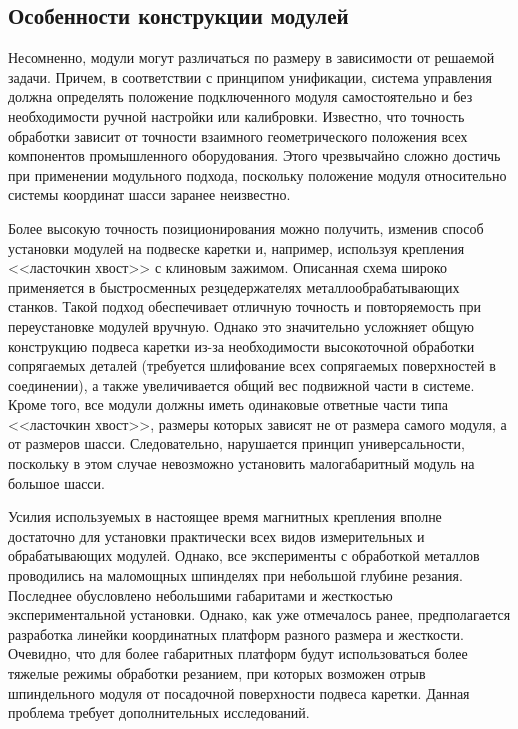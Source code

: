 \subsection{Особенности конструкции модулей}

Несомненно, модули могут различаться по размеру в зависимости от решаемой задачи. Причем, в соответствии с принципом унификации, система управления должна определять положение подключенного модуля самостоятельно и без необходимости ручной настройки или калибровки. Известно, что точность обработки зависит от точности взаимного геометрического положения всех компонентов промышленного оборудования. Этого чрезвычайно сложно достичь при применении модульного подхода, поскольку положение модуля относительно системы координат шасси заранее неизвестно.

Более высокую точность позиционирования можно получить, изменив способ установки модулей на подвеске каретки и, например, используя крепления <<ласточкин хвост>> с клиновым зажимом. Описанная схема широко применяется в быстросменных резцедержателях металлообрабатывающих станков. Такой подход обеспечивает отличную точность и повторяемость при переустановке модулей вручную. Однако это значительно усложняет общую конструкцию подвеса каретки из-за необходимости высокоточной обработки сопрягаемых деталей (требуется шлифование всех сопрягаемых поверхностей в соединении), а также увеличивается общий вес подвижной части в системе. Кроме того, все модули должны иметь одинаковые ответные части типа <<ласточкин хвост>>, размеры которых зависят не от размера самого модуля, а от размеров шасси. Следовательно, нарушается принцип универсальности, поскольку в этом случае невозможно установить малогабаритный модуль на большое шасси.

Усилия используемых в настоящее время магнитных крепления вполне достаточно для установки практически всех видов измерительных и обрабатывающих модулей. Однако, все эксперименты с обработкой металлов проводились на маломощных шпинделях при небольшой глубине резания. Последнее обусловлено небольшими габаритами и жесткостью экспериментальной установки. Однако, как уже отмечалось ранее, предполагается разработка линейки координатных платформ разного размера и жесткости. Очевидно, что для более габаритных платформ будут использоваться более тяжелые режимы обработки резанием, при которых возможен отрыв шпиндельного модуля от посадочной поверхности подвеса каретки. Данная проблема требует дополнительных исследований.

